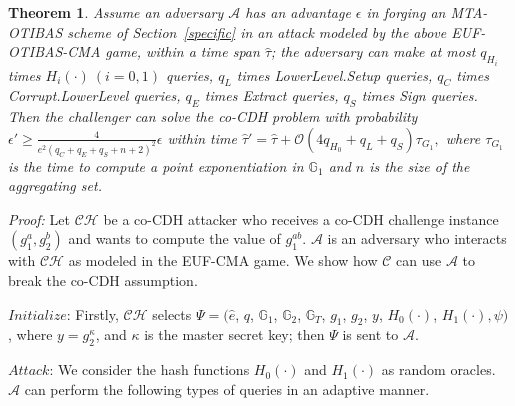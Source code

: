 \documentclass[10pt,journal,compsoc]{IEEEtran}
\newtheorem{theorem}{Theorem}
\begin{document}
\begin{theorem}
\label{teo1} Assume an adversary $\mathcal{A}$ has an advantage
$\epsilon$ in forging an MTA-OTIBAS scheme
of Section~\ref{specific} in an attack modeled by the above
EUF-OTIBAS-CMA game, within a time span $\hat{\tau}$; the adversary
can make at most $q_{H_i}$ times $H_i(\cdot)\ (i=0,1)$ queries,
$q_{L}$ times {\sf LowerLevel.Setup} queries, $q_C$ times {\sf
Corrupt.LowerLevel} queries, $q_E$ times {\sf Extract} queries,
$q_S$ times {\sf Sign} queries. Then the challenger can solve the
co-CDH problem with probability $\epsilon'\geq
\frac{4}{e^2(q_C+q_E+q_S+n+2)^2}\epsilon$ within time
$\hat{\tau}'=\hat{\tau}+\mathcal{O}(4q_{H_0}+q_L+q_S)\tau_{G_1},$
where $\tau_{G_1}$ is the time to compute a point exponentiation in
$\mathbb{G}_1$ and $n$ is the size of the aggregating set.
\end{theorem}

\emph{Proof:}
Let $\mathcal {CH}$ be a co-CDH attacker who receives a co-CDH
challenge instance $(g_1^a,g_2^b)$ and wants to compute the value of
$g_1^{ab}$. $\mathcal {A}$ is an adversary who interacts with
$\mathcal {CH}$ as modeled in the EUF-CMA game. We show how $\mathcal
{C}$ can use $\mathcal {A}$ to break the co-CDH assumption.

\smallskip\noindent $Initialize$: Firstly, $\mathcal {CH}$ selects
$\Psi=(\hat{e}$, $q$, $\mathbb{G}_1$, $\mathbb{G}_2$,
$\mathbb{G}_T$, $g_1$, $g_2$, $y$, $H_0(\cdot)$, $H_1(\cdot),\psi)$,
where $y=g_2^\kappa$, and $\kappa$ is the master secret key; then $\Psi$
is sent to $\mathcal {A}$.

\medskip
\noindent $Attack$:  We consider the hash functions $H_0(\cdot)$ and
$H_1(\cdot)$ as random oracles. $\mathcal {A}$ can perform the
following types of queries in an adaptive manner.
\end{document}
